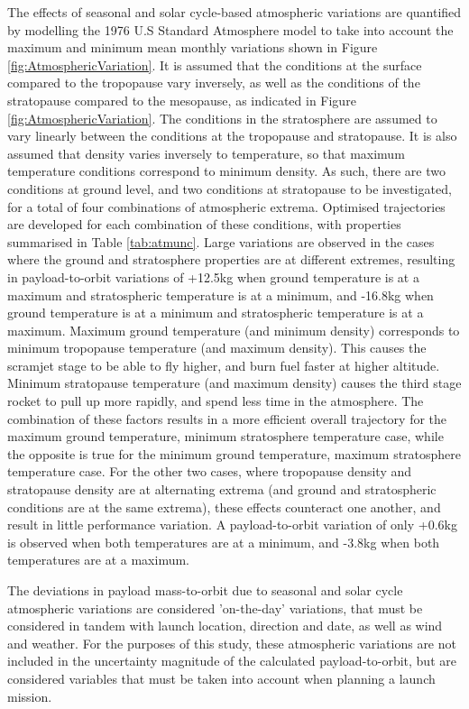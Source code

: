 


The effects of seasonal and solar cycle-based atmospheric variations are quantified by modelling the 1976 U.S Standard Atmosphere model to take into account the maximum and minimum mean monthly variations shown in Figure \ref{fig:AtmosphericVariation}. It is assumed that the conditions at the surface compared to the tropopause vary inversely, as well as the conditions of the stratopause compared to the mesopause, as indicated in Figure \ref{fig:AtmosphericVariation}. The conditions in the stratosphere are assumed to vary linearly between the conditions at the tropopause and stratopause. It is also assumed that density varies inversely to temperature, so that maximum temperature conditions correspond to minimum density. As such, there are two conditions at ground level, and two conditions at stratopause to be investigated, for a total of four combinations of atmospheric extrema. Optimised trajectories are developed for each combination of these conditions, with properties summarised in Table \ref{tab:atmunc}. Large variations are observed in the cases where the ground and stratosphere properties are at different extremes, resulting in payload-to-orbit variations of +12.5kg when ground temperature is at a maximum and stratospheric temperature is at a minimum, and -16.8kg when ground temperature is at a minimum and stratospheric temperature is at a maximum. Maximum ground temperature (and minimum density) corresponds to minimum tropopause temperature (and maximum density). This causes the scramjet stage to be able to fly higher, and burn fuel faster at higher altitude. Minimum stratopause temperature (and maximum density) causes the third stage rocket to pull up more rapidly, and spend less time in the atmosphere. The combination of these factors results in a more efficient overall trajectory for the maximum ground temperature, minimum stratosphere temperature case, while the opposite is true for the minimum ground temperature, maximum stratosphere temperature case. For the other two cases, where tropopause density and stratopause density are at alternating extrema (and ground and stratospheric conditions are at the same extrema), these effects counteract one another, and result in little performance variation. A payload-to-orbit variation of only +0.6kg is observed when both temperatures are at a minimum, and -3.8kg when both temperatures are at a maximum.

The deviations in payload mass-to-orbit due to seasonal and solar cycle atmospheric variations are considered 'on-the-day' variations, that must be considered in tandem with launch location, direction and date, as well as wind and weather. For the purposes of this study, these atmospheric variations are not included in the uncertainty magnitude of the calculated payload-to-orbit, but are considered variables that must be taken into account when planning a launch mission. 


